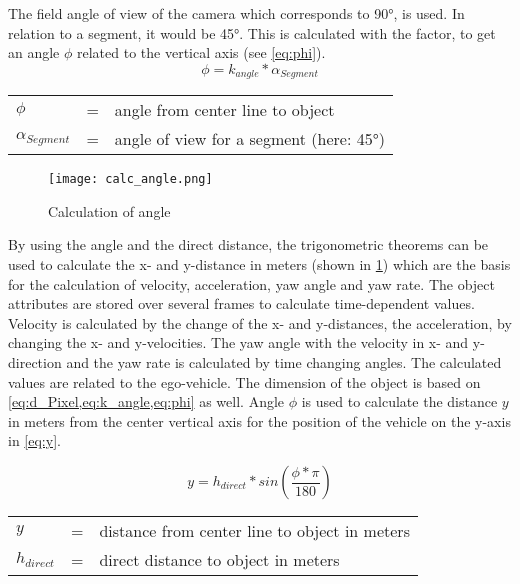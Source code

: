 The field angle of view of the camera which corresponds to \ang{90}, is used. In relation to a segment, it would be \ang{45}. This is calculated with the factor, to get an angle $\phi$ related to the vertical axis (see \cref{eq:phi}).
\begin{equation}
\phi = k_{angle} * \alpha_{Segment}
\label{eq:phi}
\end{equation}
\begin{table}[!h]
	\begin{center}
		\begin{tabular}{l c l}
			$\phi$ & = & angle from center line to object\\
			$\alpha_{Segment}$ & = &  angle of view for a segment (here: \ang{45})\\
		\end{tabular}
	\end{center}
\end{table}

\begin{figure}[b]
	\centering
	\texttt{[image: calc\_angle.png]}
	\caption{Calculation of angle}
	\label{fig:anglecalculation}
\end{figure}


By using the angle and the direct distance, the trigonometric theorems can be used to calculate the x- and y-distance in meters (shown in \cref{fig:anglecalculation}) which are the basis for the calculation of velocity, acceleration, yaw angle and yaw rate. The object attributes are stored over several frames to calculate time-dependent values. Velocity is calculated by the change of the x- and y-distances, the acceleration, by changing the x- and y-velocities. The yaw angle with the velocity in x- and y-direction and the yaw rate is calculated by time changing angles. The calculated values are related to the ego-vehicle.
The dimension of the object is based on \cref{eq:d_Pixel,eq:k_angle,eq:phi} as well. Angle $\phi$ is used to calculate the distance $y$ in meters from the center vertical axis for the position of the vehicle on the y-axis in \cref{eq:y}.

\begin{equation}
	y = h_{direct} * sin(\frac{\phi * \pi}{180})
	\label{eq:y}
\end{equation}
\begin{table}[!h]
	\begin{center}
		\begin{tabular}{l c l}
			$y$ & = & distance from center line to object in meters\\
			$h_{direct}$ & = &  direct distance to object in meters\\
		\end{tabular}
	\end{center}
\end{table}

